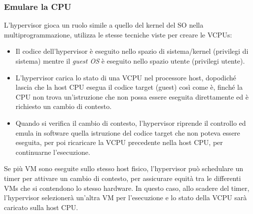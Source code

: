 \documentclass{article}
\begin{document}
\subsubsection{Emulare la CPU}
L’hypervisor gioca un ruolo simile a quello del kernel del SO nella multiprogrammazione, utilizza le stesse tecniche viste per creare le VCPUs:
\begin{itemize}
    \item{Il codice dell’hypervisor è eseguito nello spazio di sistema/kernel (privilegi di sistema) mentre il \textit{guest OS} è eseguito nello spazio utente (privilegi utente).}
    \item{L’hypervisor carica lo stato di una VCPU nel processore host, dopodiché lascia che la host CPU esegua il codice target (guest) così come è, finché la CPU non trova un’istruzione che non possa essere eseguita direttamente ed è richiesto un cambio di contesto.}
    \item{Quando si verifica il cambio di contesto, l’hypervisor riprende il controllo ed emula in software quella istruzione del codice target che non poteva essere eseguita, per poi ricaricare la VCPU precedente nella host CPU, per continuarne l’esecuzione.}
\end{itemize}
Se più VM sono eseguite sullo stesso host fisico, l’hypervisor può schedulare un timer per attivare un cambio di contesto, per assicurare equità tra le differenti VMs che si contendono lo stesso hardware.
In questo caso, allo scadere del timer, l’hypervisor selezionerà un’altra VM per l’esecuzione e lo stato della VCPU sarà caricato sulla host CPU.
\end{document}
